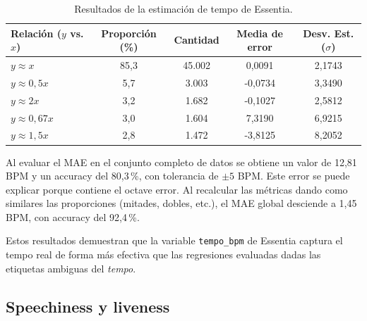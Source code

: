 \begin{table}[htpb]
    \centering
    \caption{Resultados de la estimación de tempo de Essentia.}
    \label{tab:tempo_relaciones_estadisticas}
    \renewcommand{\arraystretch}{1.2}
    \small
    \begin{tabular}{@{}lcccc@{}}
        \toprule
        \textbf{Relación ($y$ vs. $x$)} & \textbf{Proporción (\%)} & \textbf{Cantidad} & \textbf{Media de error} & \textbf{Desv. Est. ($\sigma$)} \\
        \midrule
        $y \approx x$       & 85,3 & 45.002 & 0,0091  & 2,1743 \\
        $y \approx 0,5x$    & 5,7  & 3.003  & -0,0734 & 3,3490 \\
        $y \approx 2x$      & 3,2  & 1.682  & -0,1027 & 2,5812 \\
        $y \approx 0,67x$   & 3,0  & 1.604  & 7,3190  & 6,9215 \\
        $y \approx 1,5x$    & 2,8  & 1.472  & -3,8125 & 8,2052 \\
        \bottomrule
    \end{tabular}
\end{table}

Al evaluar el MAE en el conjunto completo de datos se obtiene un valor de 12,81 BPM y un accuracy del 80,3\,\%, con tolerancia de $\pm5$ BPM. Este error se puede explicar porque contiene el octave error. 
Al recalcular las métricas dando como similares las proporciones (mitades, dobles, etc.), el MAE global desciende a 1,45 BPM, con accuracy del 92,4\,\%.

Estos resultados demuestran que la variable \texttt{tempo\_bpm} de Essentia captura el tempo real de forma más efectiva que las regresiones evaluadas dadas las etiquetas ambiguas del \textit{tempo}.



\subsection{Speechiness y liveness}

